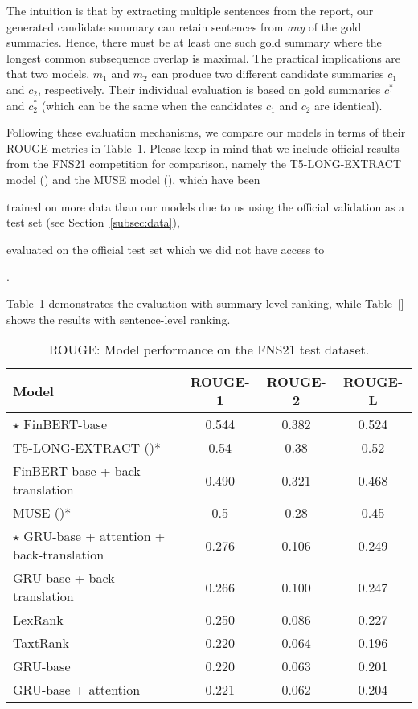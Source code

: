 The intuition is that by extracting multiple sentences from the report, our generated candidate summary can
retain sentences from \emph{any} of the gold summaries.
Hence, there must be at least one such gold summary where the longest common subsequence overlap is maximal.
The practical implications are that two models, $m_{1}$ and $m_{2}$ can produce two different candidate summaries
$c_{1}$ and $c_{2}$, respectively.
Their individual evaluation is based on gold summaries $c^{*}_{1}$ and $c^{*}_{2}$ (which can be the same when the
candidates $c_{1}$ and $c_{2}$ are identical).

Following these evaluation mechanisms, we compare our models in terms of their ROUGE metrics in Table~\ref{tab:rouge_performance}.
Please keep in mind that we include official results from the FNS21 competition for comparison, namely the T5-LONG-EXTRACT model
(\cite{orzhenovskii-2021-t5}) and the MUSE model (\cite{litvak-last-2013-multilingual}), which have been
\begin{enumerate*}
    \item trained on more data than our models due to us using the official validation as a test set (see Section~\ref{subsec:data}),
    \item evaluated on the official test set which we did not have access to
\end{enumerate*}.

Table~\ref{tab:rouge_performance} demonstrates the evaluation with summary-level ranking, while Table~\ref{} shows the results with sentence-level ranking.

\begin{table}[ht]
    \centering
    \begin{tabular}{lccc}
        \toprule
        \textbf{Model} & \textbf{ROUGE-1} & \textbf{ROUGE-2} & \textbf{ROUGE-L} \\
        \midrule
            $\star$ FinBERT-base & 0.544 & 0.382 & 0.524 \\
            T5-LONG-EXTRACT (\cite{orzhenovskii-2021-t5})* & 0.54 & 0.38 & 0.52 \\
            FinBERT-base + back-translation & 0.490 & 0.321 & 0.468 \\
            MUSE (\cite{litvak-last-2013-multilingual})* & 0.5 & 0.28 & 0.45 \\
            $\star$ GRU-base + attention + back-translation & 0.276 & 0.106 & 0.249 \\
            GRU-base + back-translation & 0.266 & 0.100 & 0.247 \\
            LexRank & 0.250 & 0.086 & 0.227 \\
            TaxtRank & 0.220 & 0.064 & 0.196 \\
            GRU-base & 0.220 & 0.063 & 0.201 \\
            GRU-base + attention & 0.221 & 0.062 & 0.204 \\
        \bottomrule
    \end{tabular}\caption{ROUGE: Model performance on the FNS21 test dataset.}
    \label{tab:rouge_performance}
\end{table}

